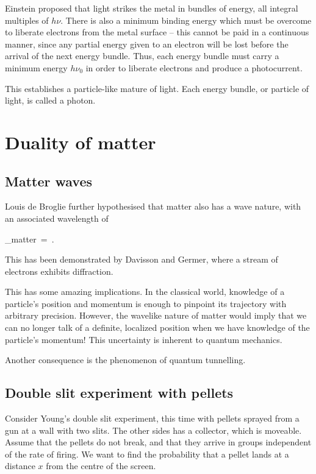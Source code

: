 \documentclass[11pt]{article}
\theoremstyle{definition}
\newenvironment{boxedeq*}%
    {\begin{equationbox}\begin{equation*}}%
    {\end{equation*}\end{equationbox}}
\theoremstyle{remark}
\numberwithin{equation}{section}
\begin{document}
    Einstein proposed that light strikes the metal in bundles of energy, all
    integral multiples of $h\nu$. There is also a minimum binding energy which must
    be overcome to liberate electrons from the metal surface -- this cannot be paid
    in a continuous manner, since any partial energy given to an electron will be
    lost before the arrival of the next energy bundle. Thus, each energy bundle must
    carry a minimum energy $h\nu_0$ in order to liberate electrons and produce a
    photocurrent.

    This establishes a particle-like mature of light. Each energy bundle, or
    particle of light, is called a photon.

    \section{Duality of matter}
    \subsection{Matter waves}
    Louis de Broglie further hypothesised that matter also has a wave nature, with
    an associated wavelength of 
    \begin{boxedeq*}
        \lambda_{matter} \,=\, .
    \end{boxedeq*}
    This has been demonstrated by Davisson and Germer, where a stream of electrons
    exhibits diffraction.
    
    This has some amazing implications. In the classical world, knowledge of a
    particle's position and momentum is enough to pinpoint its trajectory with
    arbitrary precision. However, the wavelike nature of matter would imply that we
    can no longer talk of a definite, localized position when we have knowledge of
    the particle's momentum! This uncertainty is inherent to quantum mechanics.

    Another consequence is the phenomenon of quantum tunnelling.

    \subsection{Double slit experiment with pellets}
    Consider Young's double slit experiment, this time with pellets sprayed from a
    gun at a wall with two slits. The other sides has a collector, which is
    moveable. Assume that the pellets do not break, and that they arrive in groups
    independent of the rate of firing. We want to find the probability that a pellet
    lands at a distance $x$ from the centre of the screen.
\end{document}
